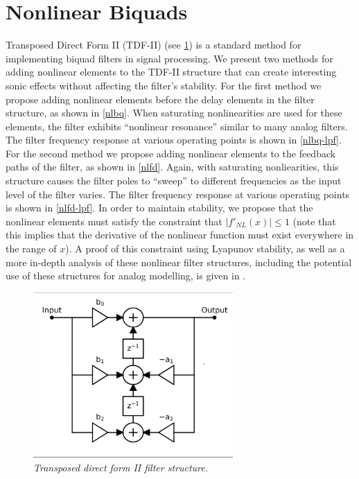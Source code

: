 \documentclass[twoside,a4paper]{article}
\begin{document}
\section{Nonlinear Biquads} \label{sec:nlbq}
%
Transposed Direct Form II (TDF-II) (see \cref{tdf2}) is a standard method for
implementing biquad filters in signal processing. We present two
methods for adding nonlinear elements to the TDF-II structure that
can create interesting sonic effects without affecting the filter's
stability.
\newline\newline
For the first method we propose adding nonlinear elements before the delay
elements in the filter structure, as shown in \cref{nlbq}. When saturating
nonlinearities are used for these elements, the filter exhibits ``nonlinear
resonance'' similar to many analog filters. The filter frequency response at
various operating points is shown in \cref{nlbq-lpf}.
\newline\newline
For the second method we propose adding nonlinear elements to the feedback
paths of the filter, as shown in \cref{nlfd}. Again, with saturating
nonliearities, this structure causes the filter poles to ``sweep'' to
different frequencies as the input level of the filter varies. The filter
frequency response at various operating points is shown in \cref{nlfd-lpf}.
\newline\newline
In order to maintain stability, we propose that the nonlinear elements must
satisfy the constraint that $|f'_{NL}(x)| \leq 1$ (note that this implies that
the derivative of the nonlinear function must exist everywhere in the range
of $x$). A proof of this constraint using Lyapunov stability, as well as a
more in-depth analysis of these nonlinear filter structures, including the
potential use of these structures for analog modelling, is given in
\cite{NLBiquad}.
%
\begin{figure}[!htb]
    \center
    \includegraphics[width=3in]{../NonlinearBiquad/Pics/TDF-II-White.png}
    \caption{\label{tdf2}{\it Transposed direct form II filter structure.}}
\end{figure}
\end{document}

